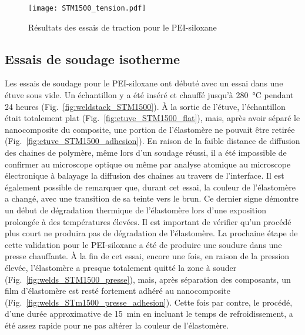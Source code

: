 \begin{figure}[h]
	\centering
	\texttt{[image: STM1500\_tension.pdf]}
	\caption{Résultats des essais de traction pour le PEI-siloxane}
	\label{fig:STM1500_tension}
\end{figure}

\FloatBarrier
\subsection{Essais de soudage isotherme}

Les essais de soudage pour le PEI-siloxane ont débuté avec un essai dans une étuve sous vide. 
Un échantillon y a été inséré et chauffé jusqu'à \SI[locale=FR]{280}{\celsius} pendant 24 heures (Fig.~\ref{fig:weldstack_STM1500}). 
À la sortie de l'étuve, l'échantillon était totalement plat (Fig.~\ref{fig:etuve_STM1500_flat}), mais, après avoir séparé le nanocomposite du composite, une portion de l'élastomère ne pouvait être retirée (Fig.~\ref{fig:etuve_STM1500_adhesion}). 
En raison de la faible distance de diffusion des chaines de polymère, même lors d'un soudage réussi, il a été impossible de confirmer au microscope optique ou même par analyse atomique au microscope électronique à balayage la diffusion des chaines au travers de l'interface. 
Il est également possible de remarquer que, durant cet essai, la couleur de l'élastomère a changé, avec une transition de sa teinte vers le brun.  
Ce dernier signe démontre un début de dégradation thermique de l'élastomère lors d'une exposition prolongée à des températures élevées. 
Il est important de vérifier qu'un procédé plus court ne produira pas de dégradation de l'élastomère. 
La prochaine étape de cette validation pour le PEI-siloxane a été de produire une soudure dans une presse chauffante. 
À la fin de cet essai, encore une fois, en raison de la pression élevée, l'élastomère a presque totalement quitté la zone à souder (Fig.~\ref{fig:welds_STM1500_presse}), mais, après séparation des composants, un film d'élastomère est resté fortement adhéré au nanocomposite (Fig.~\ref{fig:welds_STm1500_presse_adhesion}). 
Cette fois par contre, le procédé, d'une durée approximative de \SI[locale=FR]{15}{\minute} en incluant le temps de refroidissement, a été assez rapide pour ne pas altérer la couleur de l'élastomère. 

